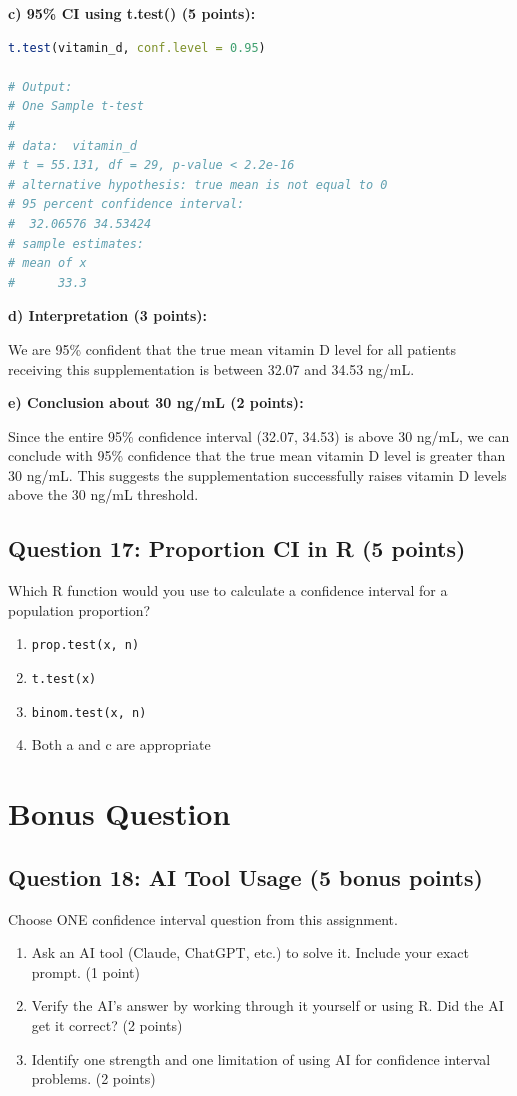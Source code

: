 \documentclass[11pt]{article}
\begin{document}
\textbf{c) 95\% CI using t.test() (5 points):}
\begin{lstlisting}[language=R, basicstyle=\small\ttfamily]
t.test(vitamin_d, conf.level = 0.95)

# Output:
# One Sample t-test
#
# data:  vitamin_d
# t = 55.131, df = 29, p-value < 2.2e-16
# alternative hypothesis: true mean is not equal to 0
# 95 percent confidence interval:
#  32.06576 34.53424
# sample estimates:
# mean of x
#      33.3
\end{lstlisting}

\textbf{d) Interpretation (3 points):}

We are 95\% confident that the true mean vitamin D level for all patients receiving this supplementation is between 32.07 and 34.53 ng/mL.

\textbf{e) Conclusion about 30 ng/mL (2 points):}

Since the entire 95\% confidence interval (32.07, 34.53) is above 30 ng/mL, we can conclude with 95\% confidence that the true mean vitamin D level is greater than 30 ng/mL. This suggests the supplementation successfully raises vitamin D levels above the 30 ng/mL threshold.

\subsection*{Question 17: Proportion CI in R (5 points)}

Which R function would you use to calculate a confidence interval for a population proportion?

\begin{enumerate}[label=\alph*)]
\item \texttt{prop.test(x, n)}
\item \texttt{t.test(x)}
\item \texttt{binom.test(x, n)}
\item Both a and c are appropriate
\end{enumerate}

\section*{Bonus Question}

\subsection*{Question 18: AI Tool Usage (5 bonus points)}

Choose ONE confidence interval question from this assignment.
\begin{enumerate}[label=\alph*)]
\item Ask an AI tool (Claude, ChatGPT, etc.) to solve it. Include your exact prompt. (1 point)
\item Verify the AI's answer by working through it yourself or using R. Did the AI get it correct? (2 points)
\item Identify one strength and one limitation of using AI for confidence interval problems. (2 points)
\end{enumerate}
\end{document}
